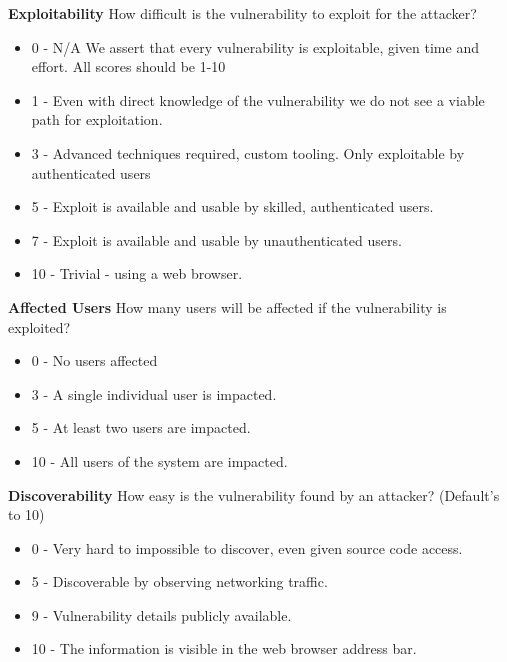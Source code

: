 \documentclass [11pt, proquest] {uwthesis}[2020/02/24]
\begin{document}
\textbf{Exploitability}
How difficult is the vulnerability to exploit for the attacker?
\begin{small}
\begin{itemize}
\label{dread:exploitability}
	\item 0 - N/A We assert that every vulnerability is exploitable, given time and effort. All scores should be 1-10
    \item 1 - Even with direct knowledge of the vulnerability we do not see a viable path for exploitation.
    \item 3 -  Advanced techniques required, custom tooling. Only exploitable by authenticated users
    \item 5 - Exploit is available and usable by skilled, authenticated users.
    \item 7 - Exploit is available and usable by unauthenticated users.
    \item 10 - Trivial - using a web browser.
\end{itemize}
\end{small}
\bigskip

\textbf{Affected Users}
How many users will be affected if the vulnerability is exploited?
\begin{small}
\begin{itemize}
\label{dread:affectedusers}
	\item 0 - No users affected
    \item 3 - A single individual user is impacted.
    \item 5 - At least two users are impacted.
    \item 10 - All users of the system are impacted.
\end{itemize}
\end{small}
\bigskip

\textbf{Discoverability}
How easy is the vulnerability found by an attacker? (Default's to 10)
\begin{small}
\begin{itemize}
\label{dread:Discoverability}
	\item 0 - Very hard to impossible to discover, even given source code access.
    \item 5 - Discoverable by observing networking traffic.
    \item 9 - Vulnerability details publicly available.
    \item 10 - The information is visible in the web browser address bar.
\end{itemize}
\end{small}
\bigskip
\end{document}
